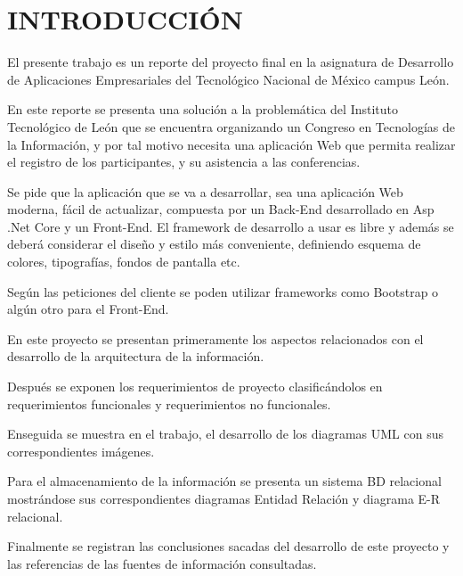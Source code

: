 \chapter*{INTRODUCCIÓN} 
El presente trabajo es un reporte del proyecto final en la asignatura de Desarrollo de Aplicaciones Empresariales del Tecnológico Nacional de México campus León.

En este reporte se presenta una solución a la problemática del Instituto Tecnológico de León que se encuentra organizando un Congreso en Tecnologías de la Información, y por tal motivo necesita una aplicación Web que permita realizar el registro de los participantes, y su asistencia a las conferencias.  

Se pide que la aplicación que se va a desarrollar, sea una aplicación Web moderna, fácil de actualizar, compuesta por un Back-End desarrollado en Asp .Net Core y un Front-End. El framework de desarrollo a usar es libre y además se deberá considerar el diseño y estilo más conveniente, definiendo esquema de colores, tipografías, fondos de pantalla etc. 

Según las peticiones del cliente se poden utilizar frameworks como Bootstrap o algún otro para el Front-End.

En este proyecto se presentan primeramente los aspectos relacionados con el desarrollo de la arquitectura de la información.

Después se exponen los requerimientos de proyecto clasificándolos en requerimientos funcionales y requerimientos no funcionales.

Enseguida se muestra en el trabajo, el desarrollo de los diagramas UML con sus correspondientes imágenes.

Para el almacenamiento de la información se presenta un sistema BD relacional mostrándose sus correspondientes diagramas Entidad Relación y diagrama E-R relacional.

Finalmente se registran las conclusiones sacadas del desarrollo de este proyecto y las referencias de las fuentes de información consultadas.

